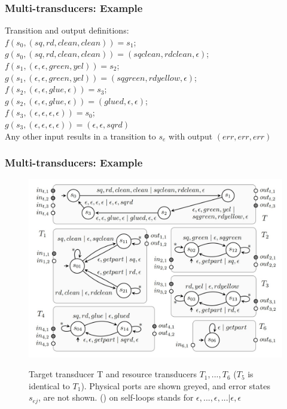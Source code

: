 \documentclass{beamer}
\theoremstyle{definition}
\theoremstyle{plain}
\begin{document}
\begin{frame}
\frametitle{Multi-transducers: Example}
Transition and output definitions:\\
$f(s_{0}, (sq, rd, clean, clean)) = s_{1}$;\\
$g(s_{0}, (sq, rd, clean, clean)) = (sqclean, rdclean, \epsilon)$; \\
\vspace{0.2cm}
$f(s_{1}, (\epsilon, \epsilon, green, yel))= s_{2}$;\\
$g(s_{1}, (\epsilon, \epsilon, green, yel)) = (sqgreen, rdyellow, \epsilon)$;\\
\vspace{0.2cm}
$f(s_{2}, (\epsilon, \epsilon, glue, \epsilon)) = s_{3}$;\\
$g(s_{2}, (\epsilon, \epsilon, glue, \epsilon)) = (glued, \epsilon,\epsilon)$;\\
\vspace{0.2cm}
$f(s_{3}, (\epsilon, \epsilon, \epsilon, \epsilon)) = s_{0}$;\\
$g(s_{3}, (\epsilon, \epsilon, \epsilon, \epsilon)) = (\epsilon,\epsilon, sqrd)$\\
\vspace{0.2cm}
Any other input results in a transition to $s_{e}$ with output $(err, err, err)$
\end{frame}

\begin{frame}
\frametitle{Multi-transducers: Example}
\begin{figure}
\includegraphics[scale=0.55]{images/milti-example.jpg}
\label{multi_example}
\caption{Target transducer T and resource transducers $T_{1}, . . . , T_{6}$ ($T_{5}$ is identical to $T_{1}$). Physical ports are shown greyed, and error states $s_{ej}$, are not shown. (\ast) on self-loops stands for $\epsilon, . . . , \epsilon, . . . | \epsilon, \epsilon$}
\end{figure}


\end{frame}
\end{document}
